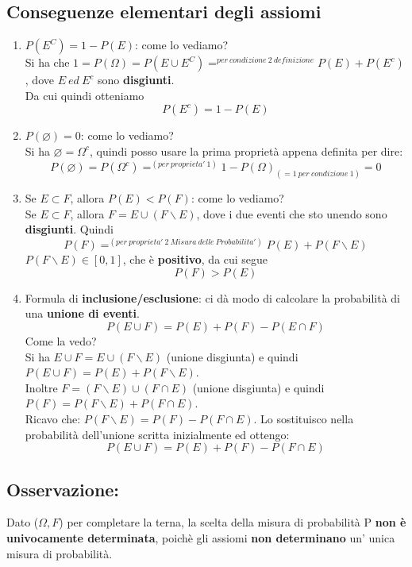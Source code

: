 \documentclass{report}
\begin{document}
\subsection{Conseguenze elementari degli assiomi}
\begin{enumerate}
    \item \(P(E^C) = 1-P(E)\): come lo vediamo?\\
    Si ha che \(1 = P(\Omega) = P(E \cup E^C) =^{per\ condizione\ 2\ definizione} P(E) + P(E^c)\), dove \(E\ ed\ E^c\) sono \textbf{disgiunti}.\\
    Da cui quindi otteniamo \[P(E^c) = 1 - P(E)\]
    \item \(P(\varnothing) = 0\): come lo vediamo?\\
    Si ha \(\varnothing = \Omega^c\), quindi posso usare la prima proprietà appena definita per dire: \[P(\varnothing) = P(\Omega^c) =^{(per\ proprieta'\ 1)} 1 - P(\Omega)_{(= 1\ per\ condizione\ 1)} = 0\]
    \item Se \(E \subset F\), allora \(P(E) < P(F)\): come lo vediamo?\\
    Se \(E \subset F\), allora \(F = E \cup (F\backslash E)\), dove i due eventi che sto unendo sono \textbf{disgiunti}. Quindi \[P(F) =^{(per\ proprieta'\ 2\ Misura\ delle\ Probabilita')} P(E) + P(F\backslash E)\] %
    \(P(F\backslash E) \in [0,1]\), che è \textbf{positivo}, da cui segue \[P(F) > P(E)\] 
    \item Formula di \textbf{inclusione/esclusione}: ci dà modo di calcolare la probabilità di una \textbf{unione di eventi}.
    \[P(E \cup F) = P(E) + P(F) - P(E \cap F)\] Come la vedo?\\
    Si ha \(E \cup F = E \cup (F\backslash E)\) (unione disgiunta) e quindi \(P(E \cup F) = P(E) + P(F\backslash E)\).\\
    Inoltre \(F = (F\backslash E) \cup (F \cap E)\) (unione disgiunta) e quindi \(P( F) = P(F\backslash E) + P(F \cap E)\).\\
    Ricavo che: \(P(F\backslash E) = P(F) - P(F \cap E)\). Lo sostituisco nella probabilità dell'unione scritta inizialmente ed ottengo: \[P(E \cup F) = P(E) + P(F) - P(F \cap E) \]
\end{enumerate}
\subsection{Osservazione:} Dato (\(\Omega, \textit{F}\)) per completare la terna, la scelta della misura di probabilità P \textbf{non è univocamente determinata}, poichè gli assiomi \textbf{non determinano} un' unica misura di probabilità.
\end{document}
